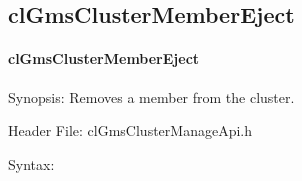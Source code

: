 \begin{flushleft}
\subsection{clGmsClusterMemberEject}
\hypertarget{pagegms206}{}\paragraph{cl\-Gms\-Cluster\-Member\-Eject}\label{pagegms206}
\begin{Desc}
\item[Synopsis:]Removes a member from the cluster.\end{Desc}
\begin{Desc}
\item[Header File:]clGmsClusterManageApi.h\end{Desc}
\begin{Desc}
\item[Syntax:]


\end{Desc}
\end{flushleft}
